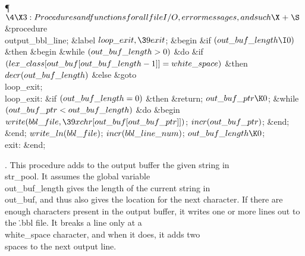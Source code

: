 \Y\P$\4\X3:Procedures and functions for all file I/O, error messages, and such%
\X\mathrel{+}\S$\6
\4\&{procedure}\1\  \\{output\_bbl\_line};\6
\4\&{label} $\\{loop\_exit},\39\\{exit}$;\2\6
\&{begin} \&{if} $(\\{out\_buf\_length}\I0)$ \1\&{then}\6
\&{begin} \&{while} $(\\{out\_buf\_length}>0)$ \1\&{do}\6
\&{if} $(\\{lex\_class}[\\{out\_buf}[\\{out\_buf\_length}-1]]=\\{white%
\_space})$ \1\&{then}\5
$\\{decr}(\\{out\_buf\_length})$\6
\4\&{else} \&{goto} \\{loop\_exit};\2\2\6
\4\\{loop\_exit}: \&{if} $(\\{out\_buf\_length}=0)$ \1\&{then}\6
\&{return};\2\6
$\\{out\_buf\_ptr}\K0$;\6
\&{while} $(\\{out\_buf\_ptr}<\\{out\_buf\_length})$ \1\&{do}\6
\&{begin} $\\{write}(\\{bbl\_file},\39\\{xchr}[\\{out\_buf}[\\{out\_buf%
\_ptr}]])$;\5
$\\{incr}(\\{out\_buf\_ptr})$;\6
\&{end};\2\6
\&{end};\2\6
$\\{write\_ln}(\\{bbl\_file})$;\5
$\\{incr}(\\{bbl\_line\_num})$;\6
$\\{out\_buf\_length}\K0$;\6
\4\\{exit}: \&{end};\par
\fi

.
This procedure adds to the output buffer the given string in
\\{str\_pool}.  It assumes the global variable \\{out\_buf\_length} gives the
length of the current string in \\{out\_buf}, and thus also gives the
location for the next character.  If there are enough characters
present in the output buffer, it writes one or more lines out to the
\.{.bbl} file.  It breaks a line only at a \\{white\_space} character,
and when it does, it adds two \\{space}s to the next output line.

